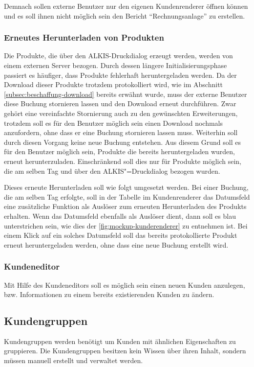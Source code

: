Demnach sollen externe Benutzer nur den eigenen Kundenrenderer öffnen können und es soll ihnen nicht möglich sein den Bericht \enquote{Rechnungsanlage} zu erstellen.

\subsubsection{Erneutes Herunterladen von Produkten}
Die Produkte, die über den ALKIS-Druckdialog erzeugt werden, werden von einem externen Server bezogen.
Durch dessen längere Initialisierungsphase passiert es häufiger, dass Produkte fehlerhaft heruntergeladen werden.
Da der Download dieser Produkte trotzdem protokolliert wird, wie im Abschnitt \ref{subsec:beschaffung-download} bereits erwähnt wurde, muss der externe Benutzer diese Buchung stornieren lassen und den Download erneut durchführen.
Zwar gehört eine vereinfachte Stornierung auch zu den gewünschten Erweiterungen, trotzdem soll es für den Benutzer möglich sein einen Download nochmals anzufordern, ohne dass er eine Buchung stornieren lassen muss.
Weiterhin soll durch diesen Vorgang keine neue Buchung entstehen.
Aus diesem Grund soll es für den Benutzer möglich sein, Produkte die bereits heruntergeladen wurden, erneut herunterzuladen. Einschränkend soll dies nur für Produkte möglich sein, die am selben Tag und über den ALKIS"=Druckdialog bezogen wurden. 

Dieses erneute Herunterladen soll wie folgt umgesetzt werden. Bei einer Buchung, die am selben Tag erfolgte, soll in der Tabelle im Kundenrenderer das Datumsfeld eine zusätzliche Funktion als Auslöser zum erneuten Herunterladen des Produkts erhalten.
Wenn das Datumsfeld ebenfalls als Auslöser dient, dann soll es blau unterstrichen sein, wie dies der \autoref{fig:mockup-kunderenderer} zu entnehmen ist.
Bei einem Klick auf ein solches Datumsfeld soll das bereits protokollierte Produkt erneut heruntergeladen werden, ohne dass eine neue Buchung erstellt wird.

\subsubsection{Kundeneditor}
Mit Hilfe des Kundeneditors soll es möglich sein einen neuen Kunden anzulegen, bzw. Informationen zu einem bereits existierenden Kunden zu ändern.

\subsection{Kundengruppen}
Kundengruppen werden benötigt um Kunden mit ähnlichen Eigenschaften zu gruppieren.
Die Kundengruppen besitzen kein Wissen über ihren Inhalt, sondern müssen manuell erstellt und verwaltet werden.

